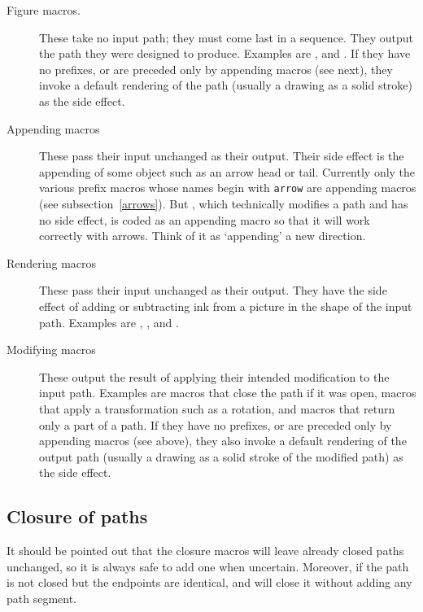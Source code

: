 \documentclass[letterpaper]{article}
\begin{document}
\begin{description}

\item[Figure macros.] These take no input path; they
    must come last in a sequence. They output the path they were
    designed to produce. Examples are ,  and
    . If they have no prefixes, or are preceded only by
    appending macros (see next), they invoke a default rendering of the
    path (usually a drawing as a solid stroke) as the side effect.

\item[Appending macros] These pass their input
    unchanged as their output. Their side effect is the appending of
    some object such as an arrow head or tail. Currently only the
    various prefix macros whose names begin with \texttt{arrow} are
    appending macros (see subsection~\ref{arrows}). But ,
    which technically modifies a path and has no side effect, is coded
    as an appending macro so that it will work correctly with arrows.
    Think of it as `appending' a new direction.

\item[Rendering macros] These pass their
    input unchanged as their output. They have the side effect of adding
    or subtracting ink from a picture in the shape of the input path.
    Examples are , ,  and .

\item[Modifying macros] These output the result of
    applying their intended modification to the input path. Examples are
    macros that close the path if it was open, macros that apply a
    transformation such as a rotation, and macros that return only a
    part of a path. If they have no prefixes, or are preceded only by
    appending macros (see above), they also invoke a default rendering
    of the output path (usually a drawing as a solid stroke of the
    modified path) as the side effect.

\end{description}


\subsection{Closure of paths}\label{closure}

It should be pointed out that the closure macros will leave already
closed paths unchanged, so it is always safe to add one when uncertain.
Moreover, if the path is not closed but the endpoints are identical,
 and  will close it without adding any path segment.
\end{document}
